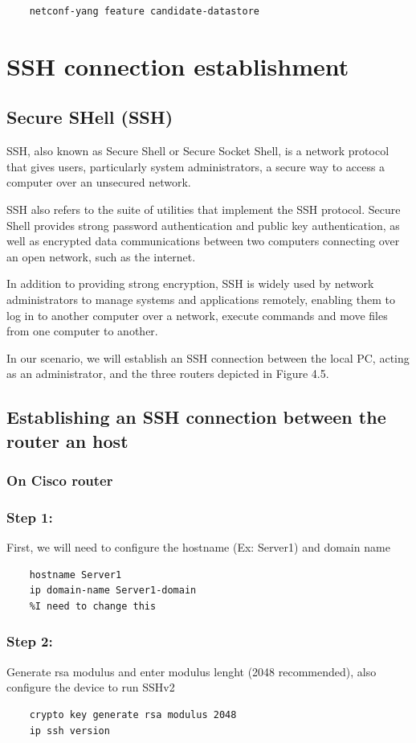 \begin{verbatim}
    netconf-yang feature candidate-datastore
\end{verbatim}
\section{SSH connection establishment}
\subsection{Secure SHell (SSH)}
SSH, also known as Secure Shell or Secure Socket Shell, is a network protocol that gives users, particularly system administrators, a secure way to access a computer over an unsecured network.

SSH also refers to the suite of utilities that implement the SSH protocol. Secure Shell provides strong password authentication and public key authentication, as well as encrypted data communications between two computers connecting over an open network, such as the internet.

In addition to providing strong encryption, SSH is widely used by network administrators to manage systems and applications remotely, enabling them to log in to another computer over a network, execute commands and move files from one computer to another.

In our scenario, we will establish an SSH connection between the local PC, acting as an administrator, and the three routers depicted in Figure 4.5.

\subsection{Establishing an SSH connection between the router an host}
\subsubsection{On Cisco router}
\subsubsection{Step 1:}
First, we will need to configure the hostname (Ex: Server1) and domain name 
\begin{verbatim}
    hostname Server1
    ip domain-name Server1-domain
    %I need to change this 
\end{verbatim}
\subsubsection{Step 2:}
Generate rsa modulus and enter modulus lenght (2048 recommended), also configure the device to run SSHv2
\begin{verbatim}
    crypto key generate rsa modulus 2048 
    ip ssh version 
\end{verbatim}

